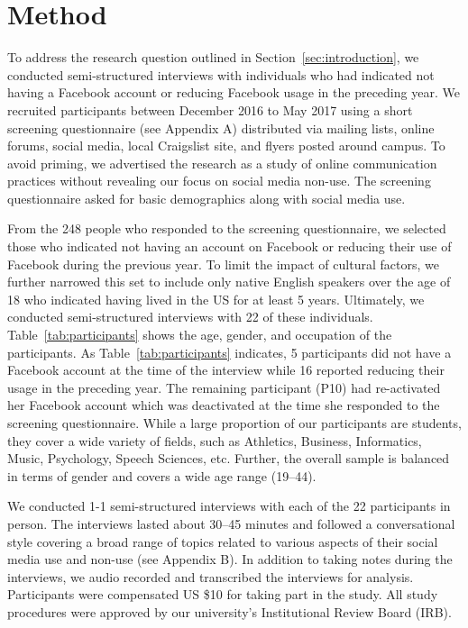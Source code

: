\section{Method}
\label{sec:method}
To address the research question outlined in Section~\ref{sec:introduction}, we conducted semi-structured interviews with individuals who had indicated not having a Facebook account or reducing Facebook usage in the preceding year. We recruited participants between December 2016 to May 2017 using a short screening questionnaire (see Appendix A) distributed via mailing lists, online forums, social media, local Craigslist site, and flyers posted around campus. To avoid priming, we advertised the research as a study of online communication practices without revealing our focus on social media non-use. The screening questionnaire asked for basic demographics along with social media use.

From the 248 people who responded to the screening questionnaire, we selected those who indicated not having an account on Facebook or reducing their use of Facebook during the previous year. To limit the impact of cultural factors, we further narrowed this set to include only native English speakers over the age of 18 who indicated having lived in the US for at least 5 years. Ultimately, we conducted semi-structured interviews with 22 of these individuals. Table~\ref{tab:participants} shows the age, gender, and occupation of the participants. As Table~\ref{tab:participants} indicates, 5 participants did not have a Facebook account at the time of the interview while 16 reported reducing their usage in the preceding year. The remaining participant (P10) had re-activated her Facebook account which was deactivated at the time she responded to the screening questionnaire. While a large proportion of our participants are students, they cover a wide variety of fields, such as Athletics, Business, Informatics, Music, Psychology, Speech Sciences, etc. Further, the overall sample is balanced in terms of gender and covers a wide age range (19--44).

We conducted 1-1 semi-structured interviews with each of the 22 participants in person. The interviews lasted about 30--45 minutes and followed a conversational style covering a broad range of topics related to various aspects of their social media use and non-use (see Appendix B). In addition to taking notes during the interviews, we audio recorded and transcribed the interviews for analysis. Participants were compensated US \$10 for taking part in the study. All study procedures were approved by our university's Institutional Review Board (IRB).


